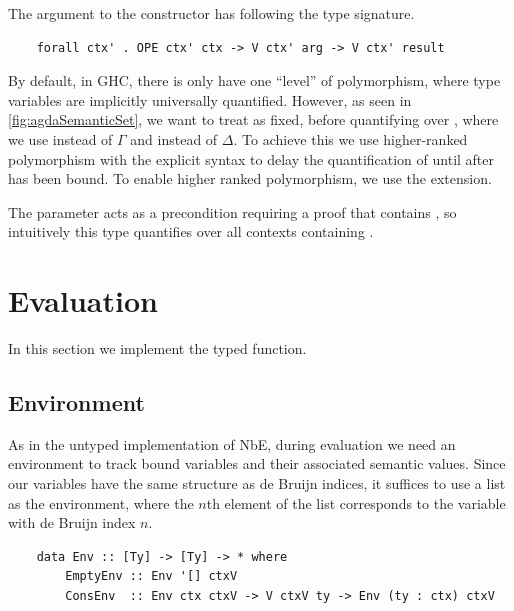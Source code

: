 
The argument to the  constructor has following the type signature.
\begin{lstlisting}
    forall ctx' . OPE ctx' ctx -> V ctx' arg -> V ctx' result 
\end{lstlisting}

By default, in GHC, there is only have one “level” of polymorphism, where type variables are implicitly universally quantified. However, as seen in \ref{fig:agdaSemanticSet}, we want to treat  as fixed, before quantifying over , where we use  instead of $\Gamma$ and  instead of $\Delta$.
To achieve this we use higher-ranked polymorphism with the explicit  syntax to delay the quantification of  until after  has been bound. To enable higher ranked polymorphism, we use the  extension. 

The  parameter acts as a precondition requiring a proof that  contains , so intuitively this type quantifies over all contexts containing .


\section{Evaluation}

In this section we implement the typed  function.

\subsection{Environment}


As in the untyped implementation of NbE, during evaluation we need an environment to track bound variables and their associated semantic values. Since our variables have the same structure as de Bruijn indices, it suffices to use a list as the environment, where the $n$th element of the list corresponds to the variable with de Bruijn index $n$.


\begin{lstlisting}
    data Env :: [Ty] -> [Ty] -> * where
        EmptyEnv :: Env '[] ctxV
        ConsEnv  :: Env ctx ctxV -> V ctxV ty -> Env (ty : ctx) ctxV
\end{lstlisting}

